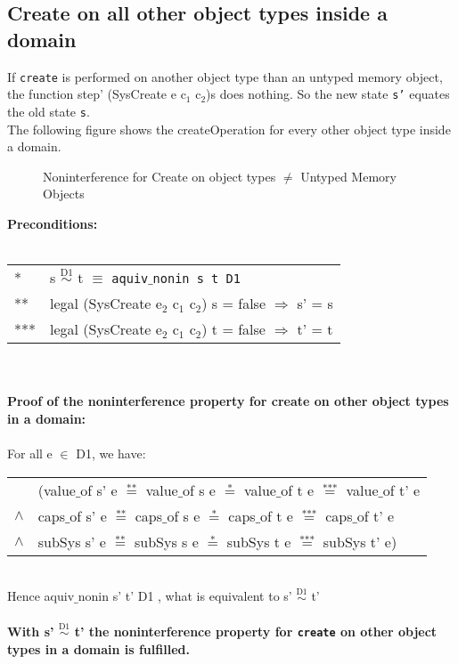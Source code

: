 \subsection{Create on all other object types inside a domain}
If \texttt{create} is performed on another object type than an untyped memory object, the  function step' (SysCreate e c$_1$ c$_2$)s does nothing. So the new state \texttt{s'} equates the old state \texttt{s}. \\
The following figure shows the createOperation for every other object type inside a domain.\\
\begin{figure}[H]
\caption{Noninterference for Create on object types $\neq$ Untyped Memory Objects}
\end{figure} 
\textbf{Preconditions:} \\ \\
\begin{tabular}{ll}
* & s $\overset{\text{D1}}{\sim}$ t $\equiv$ \texttt{aquiv$\_$nonin s t D1}	\\ 
** & legal (SysCreate e$_2$ c$_1$ c$_2$) s = false $\Rightarrow$ s' = s \\ 
*** & legal (SysCreate e$_2$ c$_1$ c$_2$) t = false $\Rightarrow$ t' = t
\end{tabular}\\ \\  
\textbf{Proof of the noninterference property for create on other object types in a domain:} \\ \\
For all e $\in$ D1, we have: \\ 
\begin{tabular}{ll}
& (value$\_$of s' e $\overset{\text{**}}{=}$ value$\_$of s e $\overset{\text{*}}{=}$ value$\_$of t e $\overset{\text{***}}{=}$ value$\_$of t' e \\
$\wedge$ & caps$\_$of s' e $\overset{\text{**}}{=}$ caps$\_$of s e $\overset{\text{*}}{=}$ caps$\_$of t e $\overset{\text{***}}{=}$ caps$\_$of t' e \\
$\wedge$ & subSys s' e $\overset{\text{**}}{=}$ subSys s e $\overset{\text{*}}{=}$ subSys t e $\overset{\text{***}}{=}$ subSys t' e)
\end{tabular} \\
Hence aquiv$\_$nonin s' t' D1 , what is equivalent to s' $\overset{\text{D1}}{\sim}$ t' \\ \\ 
\textbf{With s' $\overset{\text{D1}}{\sim}$ t' the noninterference property for \texttt{create} on other object types in a domain is fulfilled.} 
